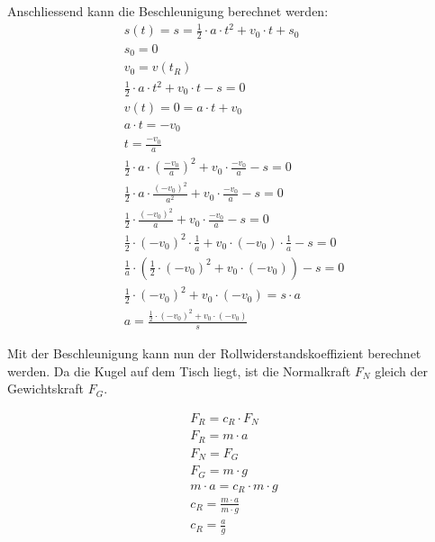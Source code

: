 Anschliessend kann die Beschleunigung berechnet werden:
\begin{align}
    s(t) = s = \frac{1}{2} \cdot a \cdot t^2 + v_0 \cdot t + s_0\\
    s_0 = 0\\
    v_0 = v(t_R)\\
    \frac{1}{2} \cdot a \cdot t^2 + v_0 \cdot t - s = 0\\
    v(t) = 0 = a \cdot t + v_0\\
    a \cdot t = -v_0\\
    t = \frac{-v_0}{a}\\
    \frac{1}{2} \cdot a \cdot (\frac{-v_0}{a})^2 + v_0 \cdot \frac{-v_0}{a} - s = 0\\
    \frac{1}{2} \cdot a \cdot \frac{(-v_0)^2}{a^2} + v_0 \cdot \frac{-v_0}{a} - s = 0\\
    \frac{1}{2} \cdot \frac{(-v_0)^2}{a} + v_0 \cdot \frac{-v_0}{a} - s = 0\\
    \frac{1}{2} \cdot (-v_0)^2 \cdot \frac{1}{a} + v_0 \cdot (-v_0) \cdot \frac{1}{a} - s = 0\\
    \frac{1}{a} \cdot (\frac{1}{2} \cdot (-v_0)^2 + v_0 \cdot (-v_0)) - s = 0\\
    \frac{1}{2} \cdot (-v_0)^2 + v_0 \cdot (-v_0) = s \cdot a\\
    a = \frac{\frac{1}{2} \cdot (-v_0)^2 + v_0 \cdot (-v_0)}{s}
\end{align}

Mit der Beschleunigung kann nun der Rollwiderstandskoeffizient berechnet werden.
Da die Kugel auf dem Tisch liegt, ist die Normalkraft $F_N$ gleich der Gewichtskraft $F_G$.

\begin{align}
    F_R = c_R \cdot F_N\\
    F_R = m \cdot a\\
    F_N = F_G\\
    F_G = m \cdot g\\
    m \cdot a = c_R \cdot m \cdot g\\
    c_R = \frac{m \cdot a}{m \cdot g}\\
    c_R = \frac{a}{g}
\end{align}


